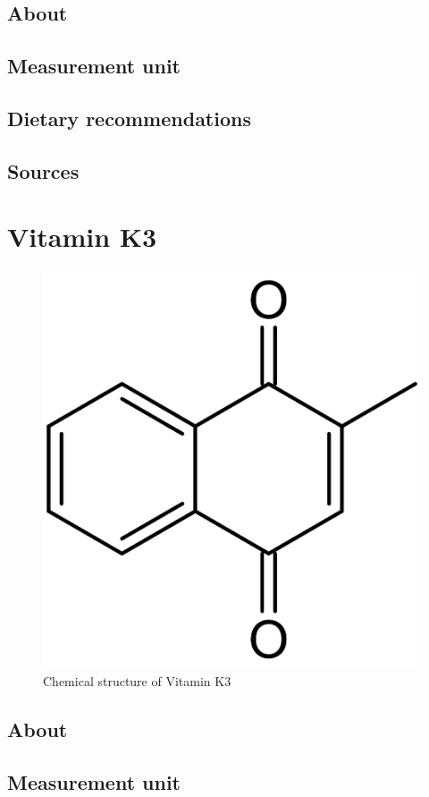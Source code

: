 \documentclass{book}
\begin{document}
\section{About}


\section{Measurement unit}


\section{Dietary recommendations}


\section{Sources}


\chapter{Vitamin K3}
\begin{figure}[h]
	\centering \includegraphics[width=0.75\linewidth]{images/Vitamin_K3_chemical_structure}
	\caption{Chemical structure of Vitamin K3}
\end{figure}

\section{About}


\section{Measurement unit}
\end{document}

